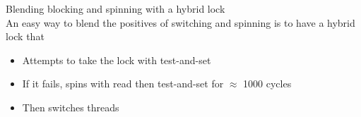 \documentclass[journal, letterpaper]{IEEEtran}
\begin{document}
\begin{example}{Blending blocking and spinning with a hybrid lock} \\
    An easy way to blend the positives of switching and spinning is to have a hybrid lock that
    \begin{itemize}
        \item Attempts to take the lock with test-and-set
        \item If it fails, spins with read then test-and-set for $\approx$ 1000 cycles
        \item Then switches threads
    \end{itemize}
\end{example}
\end{document}
